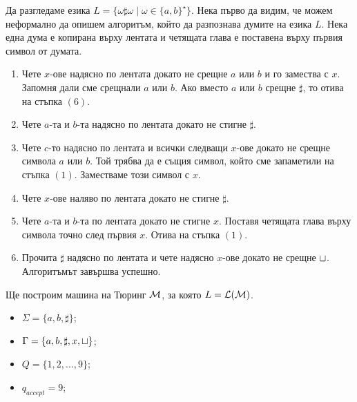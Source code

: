 \begin{example}
  Да разгледаме езика $L = \{\omega \sharp \omega \mid \omega\in\{a,b\}^\star\}$.
  Нека първо да видим, че можем неформално да опишем алгоритъм, който да разпознава думите на езика $L$.
  Нека една дума е копирана върху лентата и четящата глава е поставена върху първия символ от думата.
  \begin{enumerate}[(1)]
  \item 
    Чете $x$-ове надясно по лентата докато не срещне $a$ или $b$ и го замества с $x$.
    Запомня дали сме срещнали $a$ или $b$.
    Ако вместо $a$ или $b$ срещне $\sharp$, то отива на стъпка $(6)$.
  \item
    Чете $a$-та и $b$-та надясно по лентата докато не стигне $\sharp$. 
  \item
    Чете $c$-то надясно по лентата и всички следващи $x$-ове докато не срещне символа $a$ или $b$.
    Той трябва да е същия символ, който сме запаметили на стъпка $(1)$.
    Заместваме този символ с $x$.
  \item
    Чете $x$-ове наляво по лентата докато не стигне $\sharp$.
  \item
    Чете $a$-та и $b$-та по лентата докато не стигне $x$.
    Поставя четящата глава върху символа точно след първия $x$.
    Отива на стъпка $(1)$.
  \item
    Прочита $\sharp$ надясно по лентата и чете надясно $x$-ове докато не срещне $\sqcup$.
    Алгоритъмът завършва успешно.
  \end{enumerate}

  Ще построим машина на Тюринг $\mathcal{M}$, за която $L = \mathcal{L}(\mathcal{M})$.
  \begin{itemize}
  \item 
    $\Sigma = \{a,b,\sharp\}$;
  \item
    $\Gamma = \{a,b,\sharp,x,\sqcup\}$;
  \item
    $Q = \{1,2,\dots,9\}$;
  \item
    $q_{accept} = 9$;
  \end{itemize}

  \begin{figure}[H]
    \begin{center}
\end{center}
\end{figure}
\end{example}
